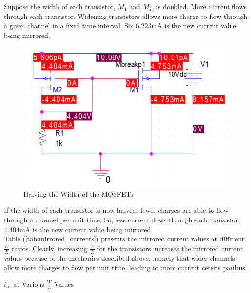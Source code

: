 \FloatBarrier

Suppose the width of each transistor, $M_1$ and $M_2$, is doubled.
More current flows through each transistor.
Widening transistors allows more charge to flow through a given channel in a fixed time interval. 
So, $6.223$\si{\milli\ampere} is the new current value being mirrored.

\FloatBarrier

\begin{figure}[h!]
	\centering
	\includegraphics[scale=0.75]{../images/half_width_means_half_current.PNG}
	\caption{Halving the Width of the MOSFETs}
	\label{fig:half_width_means_half_current}
\end{figure}

\FloatBarrier

If the width of each transistor is now halved, fewer charges are able to flow through a channel per unit time.
So, less current flows through each transistor.
$4.404$\si{\milli\ampere} is the new current value being mirrored. \\

Table (\ref{tab:mirrored_currents}) presents the mirrored current values at different $\frac{W}{L}$ ratios.
Clearly, increasing $\frac{W}{L}$ for the transistors increases the mirrored current values because of the mechanics described above, namely that wider channels allow more charges to flow per unit time, leading to more current ceteris paribus.

\FloatBarrier

\begin{table}[h!]
	\centering
	\caption{$i_{in}$ at Various $\frac{W}{L}$ Values}
	\label{tab:mirrored_currents}
\end{table}

\FloatBarrier

